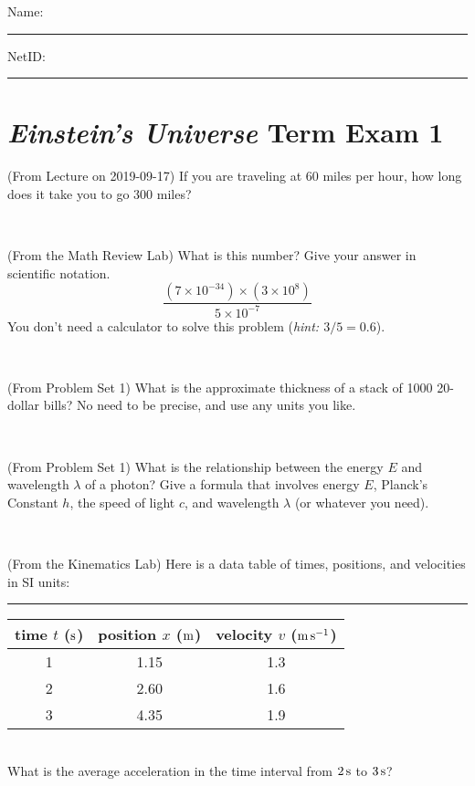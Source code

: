 \documentclass[12pt, letterpaper]{article}
\begin{document}
\cleardoublepage



\noindent
Name: \rule[-1ex]{0.60\textwidth}{0.1pt}
NetID: \rule[-1ex]{0.20\textwidth}{0.1pt}

\section*{\textsl{Einstein's Universe} Term Exam 1}
\setcounter{problem}{1}


\begin{problem} (From Lecture on 2019-09-17)
If you are traveling at 60 miles per hour, how long does
it take you to go 300 miles?
\end{problem}


\vfill ~

\begin{problem} (From the Math Review Lab)
What is this number? Give your answer in scientific notation.
$$
\frac{(7\times10^{-34})\times(3\times10^8)}{5\times10^{-7}}
$$
You don't need a calculator to solve this problem (\textit{hint: $3/5=0.6$}).
\end{problem}


\vfill ~

\begin{problem} (From Problem Set 1)
What is the approximate thickness of a stack of 1000 20-dollar bills?
No need to be precise, and use any units you like.
\end{problem}


\vfill ~

\begin{problem} (From Problem Set 1)
What is the relationship between the energy $E$ and wavelength
$\lambda$ of a photon? Give a formula that involves energy $E$,
Planck's Constant $h$, the speed of light $c$, and wavelength
$\lambda$ (or whatever you need).
\end{problem}

\vfill ~


\clearpage


\begin{problem} (From the Kinematics Lab)
Here is a data table of times, positions, and velocities in SI units:\\
\rule{1.0in}{0pt}\begin{tabular}{c|c|c}
time $t$ ($\mathrm{s}$) & position $x$ ($\mathrm{m}$) & velocity $v$ ($\mathrm{m}\,\mathrm{s}^{-1}$) \\
\hline
1 & 1.15 & 1.3 \\
2 & 2.60 & 1.6 \\
3 & 4.35 & 1.9 \\
\hline
\end{tabular}\\
What is the average acceleration in the time interval from $2\,\mathrm{s}$ to $3\,\mathrm{s}$?
\end{problem}
\end{document}
